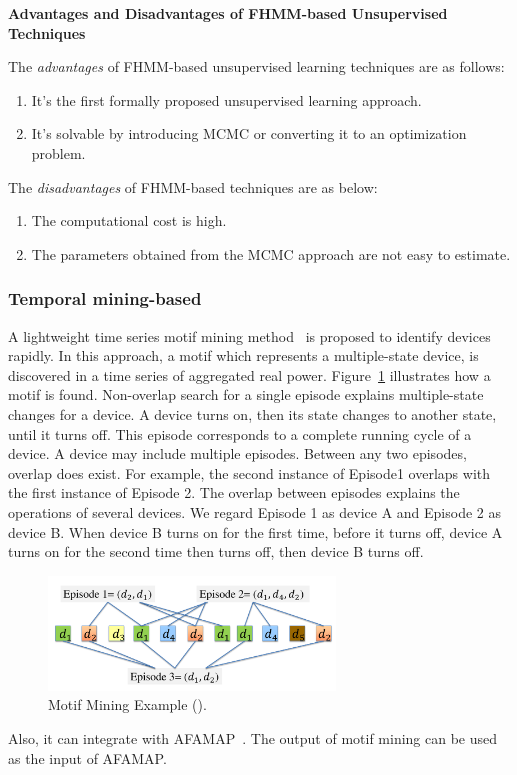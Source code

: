 \textbf{Advantages and Disadvantages of FHMM-based Unsupervised Techniques}

The \textit{advantages} of FHMM-based unsupervised learning techniques are as follows:
\begin{enumerate}
\item It's the first formally proposed unsupervised learning approach.
\item It's solvable by introducing MCMC or converting it to an optimization problem.
\end{enumerate}

The \textit{disadvantages} of FHMM-based techniques are as below:
\begin{enumerate}
\item The computational cost is high. 
\item The parameters obtained from the MCMC approach are not easy to estimate. 
\end{enumerate}

\subsubsection{Temporal mining-based}

A lightweight time series motif mining method~\cite{shao2012temporal}
is proposed to identify devices rapidly.
In this approach, a motif which represents a multiple-state device,
is discovered in a time series of aggregated real power. 
Figure~\ref{fig_motifSample} illustrates how a motif is found.
Non-overlap search for a single episode explains
multiple-state changes for a device. A device turns on, then
its state changes to another state, until it turns off. 
This episode
corresponds to a complete running cycle of a device. A
device may include multiple episodes.
Between any two episodes, overlap does exist. For example,
the second instance of Episode1 overlaps with the first
instance of Episode 2. The overlap between episodes explains
the operations of several devices. We regard Episode
1 as device A and Episode 2 as device B. When device
B turns on for the first time, before it turns off, device A
turns on for the second time then turns off, then device B
turns off.
\begin{figure}[ht]
\centering
\includegraphics[width=3in]{figs/motifSample.pdf}
\caption{Motif Mining Example (\cite{shao2012temporal}). }
\label{fig_motifSample}
\end{figure}
Also, it can integrate with AFAMAP~\cite{kolter2012aistat}.
The output of motif mining can be used as the input of
AFAMAP.

